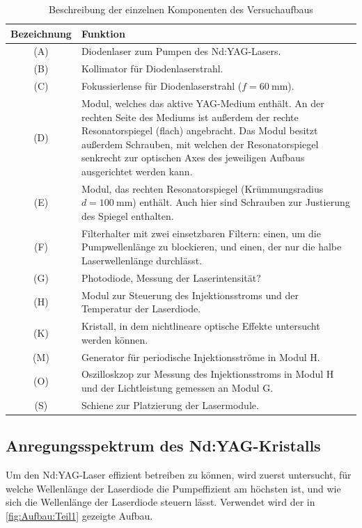 \documentclass[../main.tex]{subfiles}
\begin{document}
        \begin{table}[H]
            \centering
            \begin{tabularx}{\textwidth}{cX}
                \textbf{Bezeichnung} & \textbf{Funktion}\\\hline\hline
                (A) & Diodenlaser zum Pumpen des Nd:YAG-Lasers.\\\hline
                (B) & Kollimator für Diodenlaserstrahl.\\\hline
                (C) & Fokussierlense für Diodenlaserstrahl ($f=\SI{60}{\milli\metre}$).\\\hline
                (D) & Modul, welches das aktive YAG-Medium enthält. An der rechten Seite des Mediums ist außerdem der rechte Resonatorspiegel (flach) angebracht. Das Modul besitzt außerdem Schrauben, mit welchen der Resonatorspiegel senkrecht zur optischen Axes des jeweiligen Aufbaus ausgerichtet werden kann. \\\hline
                (E) & Modul, das rechten Resonatorspiegel (Krümmungsradius $d=\SI{100}{\milli\metre}$) enthält. Auch hier sind Schrauben zur Justierung des Spiegel enthalten.\\\hline 
                (F) & Filterhalter mit zwei einsetzbaren Filtern: einen, um die Pumpwellenlänge zu blockieren, und einen, der nur die halbe Laserwellenlänge durchlässt.\\\hline
                (G) & Photodiode, Messung der Laserintensität?\\\hline
                (H) & Modul zur Steuerung des Injektionsstroms und der Temperatur der Laserdiode.\\\hline
                (K) & Kristall, in dem nichtlineare optische Effekte untersucht werden können.\\\hline
                (M) & Generator für periodische Injektionsströme in Modul H.\\\hline
                (O) & Oszilloskzop zur Messung des Injektionsstroms in Modul H und der Lichtleistung gemessen an Modul G.\\\hline
                (S) & Schiene zur Platzierung der Lasermodule.\\\hline
            \end{tabularx}
            \caption{Beschreibung der einzelnen Komponenten des Versuchaufbaus}
            \label{tab:Aufbau:KomponentenErklaerung}
        \end{table}

    

    \subsection{Anregungsspektrum des Nd:YAG-Kristalls}
        Um den Nd:YAG-Laser effizient betreiben zu können, wird zuerst untersucht, für welche Wellenlänge der Laserdiode die Pumpeffizient am höchsten ist, und wie sich die Wellenlänge der Laserdiode steuern lässt. Verwendet wird der in \ref{fig:Aufbau:Teil1} gezeigte Aufbau.  
        
\end{document}
